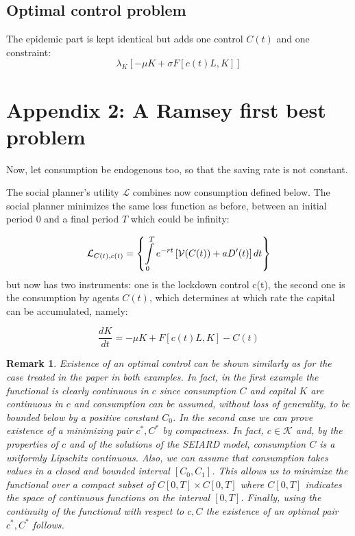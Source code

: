 \documentclass{amsart}
\newtheorem{rem}[teo]{Remark}
\begin{document}
\subsection*{Optimal control problem}

The epidemic part is kept identical but adds one control $C(t)$ and one constraint:
$$
\lambda_{K}\left[-\mu K+\sigma F[c(t)L,K]\right]
$$


\section*{Appendix 2: A Ramsey first best problem}


Now, let consumption be endogenous too, so that the saving rate is
not constant. 


{The social planner's utility $\mathcal{L}$ combines
now consumption defined below. The social planner minimizes the same
loss function as before, between an initial period $0$ and a
final period $T$ which could be infinity:}

{
\[
\mathcal{L}_{C(t),c(t)}=\left\{ \intop_{0}^{T}e^{-rt}\left[\mathcal{V}(C(t))+aD'(t)\right]dt\right\} 
\]
but now has two instruments: one is the lockdown control c(t), the
second one is the consumption by agents $C(t)$, which determines at which
rate the capital can be accumulated, namely:}

\[
\frac{dK}{dt}=-\mu K+F[c(t)L,K]-C(t)
\]
\begin{rem} Existence of an optimal control can be shown similarly as for the case treated in the paper in both examples. In fact, in the first example the functional is clearly continuous in $c$ since consumption $C$ and capital $K$ are continuous in $c$ and consumption can be assumed, without loss of generality, to be bounded below by a positive constant $C_0$. In the second case we can prove existence of a minimizing pair $c^*,C^*$ by compactness. In fact, $c\in \mathcal{K}$ and, by the properties of $c$ and of the solutions of the SEIARD model, consumption $C$ is a uniformly Lipschitz continuous. Also, we can assume that consumption takes values in a closed and bounded interval $[C_0,C_1]$. This allows us to minimize the functional over a compact subset of $C[0,T]\times C[0,T]$ where $C[0,T]$ indicates the space of continuous functions on the interval $[0,T]$. Finally, using the continuity of the functional with respect to $c,C$ the existence of an optimal pair $c^*,C^*$ follows.    
\end{rem}
\end{document}

